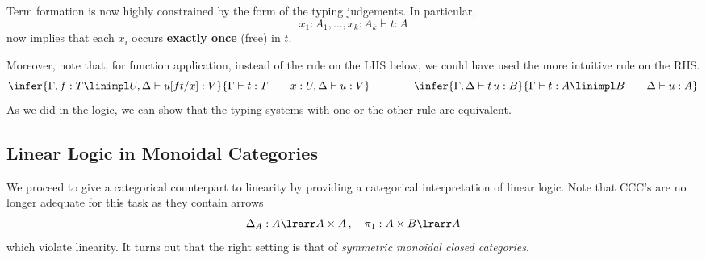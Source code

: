 \documentclass[12pt]{article}
\begin{document}
\noindent
Term formation is now highly constrained by the form of the typing judgements. In particular,
\[ x_1 : A_1 , \ldots , x_k : A_k \vdash t : A \]
now implies that each $x_i$ occurs \textbf{exactly once} (free) in $t$.

Moreover, note that, for function application, instead of the rule on the LHS
below, we could have used the more intuitive rule on the RHS.
\[ \infer{\Gamma,f:T\linimpl U,\Delta\vdash u[ft/x]:V}{\Gamma\vdash t:T\qquad x:U,\Delta\vdash u:V} \qquad\qquad
\infer{\Gamma,\Delta\vdash t\,u:B}{\Gamma\vdash t:A\linimpl B \qquad \Delta\vdash u:A}
\]
As we did in the logic, we can show that the typing systems with one or the other rule are equivalent.

\subsection{Linear Logic in Monoidal Categories}
We proceed to give a categorical counterpart to linearity by providing a categorical interpretation of linear logic.
Note that CCC's are no longer adequate for this task as they contain arrows
\[ \Delta_A:A\lrarr A\times A\,,\quad \pi_1:A\times B\lrarr A \]
which violate linearity. It turns out that the right setting is that of \emph{symmetric monoidal closed
categories}.
\end{document}
